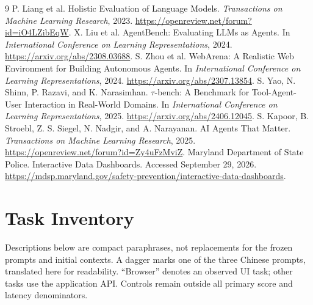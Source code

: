 \documentclass[10pt,twocolumn,letterpaper]{article}
\begin{document}
\begin{thebibliography}{9}
 P. Liang et al. Holistic Evaluation of Language Models. \emph{Transactions on Machine Learning Research}, 2023. \url{https://openreview.net/forum?id=iO4LZibEqW}.
 X. Liu et al. AgentBench: Evaluating LLMs as Agents. In \emph{International Conference on Learning Representations}, 2024. \url{https://arxiv.org/abs/2308.03688}.
 S. Zhou et al. WebArena: A Realistic Web Environment for Building Autonomous Agents. In \emph{International Conference on Learning Representations}, 2024. \url{https://arxiv.org/abs/2307.13854}.
 S. Yao, N. Shinn, P. Razavi, and K. Narasimhan. $\tau$-bench: A Benchmark for Tool-Agent-User Interaction in Real-World Domains. In \emph{International Conference on Learning Representations}, 2025. \url{https://arxiv.org/abs/2406.12045}.
 S. Kapoor, B. Stroebl, Z. S. Siegel, N. Nadgir, and A. Narayanan. AI Agents That Matter. \emph{Transactions on Machine Learning Research}, 2025. \url{https://openreview.net/forum?id=Zy4uFzMviZ}.
 Maryland Department of State Police. Interactive Data Dashboards. Accessed September 29, 2026. \url{https://mdsp.maryland.gov/safety-prevention/interactive-data-dashboards}.
\end{thebibliography}

\clearpage\onecolumn\appendix
\section{Task Inventory}\label{app:tasks}
Descriptions below are compact paraphrases, not replacements for the frozen prompts and initial contexts. A dagger marks one of the three Chinese prompts, translated here for readability. ``Browser'' denotes an observed UI task; other tasks use the application API. Controls remain outside all primary score and latency denominators.
\small

\normalsize

\clearpage
\end{document}
